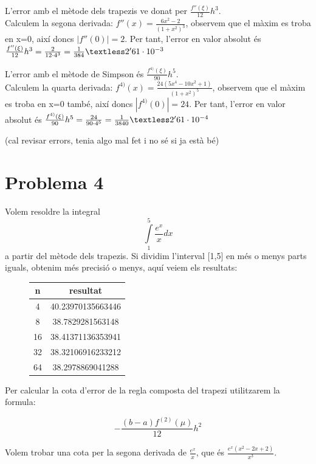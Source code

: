\documentclass{article}
\begin{document}
	L'error amb el mètode dels trapezis ve donat per $\frac{f''(\xi)}{12}h^3$. \\ Calculem la segona derivada: $f''(x)=\frac{6x^2-2}{(1+x^2)^3}$, observem que el màxim es troba en x=0, així doncs $|f''(0)|=2$. Per tant, l'error en valor absolut és $\frac{f''(\xi)}{12}h^3 = \frac{2}{12\cdot4^3} = \frac{1}{384} \textless 2'61\cdot10^{-3} $
		
	L'error amb el mètode de Simpson és $\frac{f^{4)}(\xi)}{90}h^5$. \\ Calculem la quarta derivada: $f^{4)}(x)=\frac{24(5x^4-10x^2+1)}{(1+x^2)^5}$, observem que el màxim es troba en x=0 també, així doncs $|f^{4)}(0)|=24$. Per tant, l'error en valor absolut és $\frac{f^{4)}(\xi)}{90}h^5 = \frac{24}{90\cdot4^5} = \frac{1}{3840} \textless 2'61\cdot10^{-4} $
		
		
	(cal revisar errors, tenia algo mal fet i no sé si ja està bé)
	
	\newpage	
		
	\section{Problema 4}
	Volem resoldre la integral $$\int \limits_{1}^{5} \frac{e^x}{x} dx$$
	a partir del mètode dels trapezis. Si dividim l'interval [1,5] en més o menys parts iguals, obtenim més precisió o menys, aquí veiem els resultats:
		
	\begin{figure}[h!]
		\begin{center}
			\begin{tabular}{|c|c|}
				\hline
				n & resultat \\ \hline
				4 & 40.23970135663446 \\ \hline
				8 & 38.7829281563148 \\ \hline
				16 & 38.41371136353941 \\ \hline
				32 & 38.32106916233212 \\ \hline
				64 & 38.2978869041288 \\ \hline
			\end{tabular}
		\end{center}
	\end{figure}
		
	Per calcular la cota d'error de la regla composta del trapezi utilitzarem la formula:
	
	$$-\frac{(b-a)f^{(2)}(\mu)}{12}h^2$$
	
	Volem trobar una cota per la segona derivada de $\frac{e^x}{x}$, que és $\frac{e^x(x^2-2x+2)}{x^3}$. 
	
\end{document}
